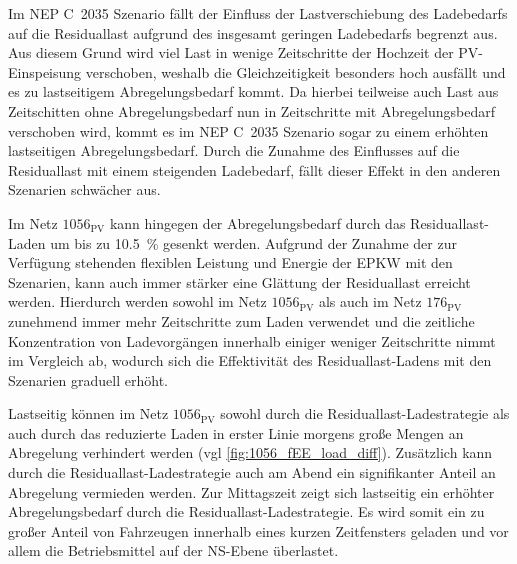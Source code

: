 Im NEP C~\num{2035} Szenario fällt der Einfluss der Lastverschiebung des Ladebedarfs auf die Residuallast aufgrund des insgesamt geringen Ladebedarfs begrenzt aus.
Aus diesem Grund wird viel Last in wenige Zeitschritte der Hochzeit der \gls{PV}-Einspeisung verschoben, weshalb die Gleichzeitigkeit besonders hoch ausfällt und es zu lastseitigem Abregelungsbedarf kommt.
Da hierbei teilweise auch Last aus Zeitschitten ohne Abregelungsbedarf nun in Zeitschritte mit Abregelungsbedarf verschoben wird, kommt es im NEP C~\num{2035} Szenario sogar zu einem erhöhten lastseitigen Abregelungsbedarf.
Durch die Zunahme des Einflusses auf die Residuallast mit einem steigenden Ladebedarf, fällt dieser Effekt in den anderen Szenarien schwächer aus.\medskip

Im Netz \(1056_{\text{PV}}\) kann hingegen der Abregelungsbedarf durch das Residuallast-Laden um bis zu \SI{10.5}{\percent} gesenkt werden.
Aufgrund der Zunahme der zur Verfügung stehenden flexiblen Leistung und Energie der \gls{EPKW} mit den Szenarien, kann auch immer stärker eine Glättung der Residuallast erreicht werden.
Hierdurch werden sowohl im Netz \(1056_{\text{PV}}\) als auch im Netz \(176_{\text{PV}}\) zunehmend immer mehr Zeitschritte zum Laden verwendet und die zeitliche Konzentration von Ladevorgängen innerhalb einiger weniger Zeitschritte nimmt im Vergleich ab, wodurch sich die Effektivität des Residuallast-Ladens mit den Szenarien graduell erhöht.\medskip

Lastseitig können im Netz \(1056_{\text{PV}}\) sowohl durch die Residuallast-Ladestrategie als auch durch das reduzierte Laden in erster Linie morgens große Mengen an Abregelung verhindert werden (vgl \autoref{fig:1056_fEE_load_diff}).
Zusätzlich kann durch die Residuallast-Ladestrategie auch am Abend ein signifikanter Anteil an Abregelung vermieden werden.
Zur Mittagszeit zeigt sich lastseitig ein erhöhter Abregelungsbedarf durch die Residuallast-Ladestrategie.
Es wird somit ein zu großer Anteil von Fahrzeugen innerhalb eines kurzen Zeitfensters geladen und vor allem die Betriebsmittel auf der \gls{NS}-Ebene überlastet.



